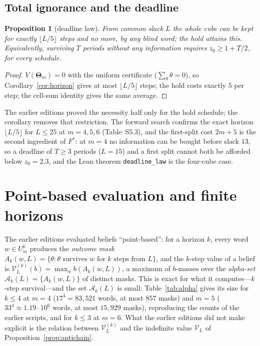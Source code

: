 \documentclass[11pt,a4paper]{article}
\theoremstyle{plain}
\newtheorem{proposition}[theorem]{Proposition}
\theoremstyle{definition}
\theoremstyle{remark}
\newcommand{\calA}{\mathcal{A}}
\let\GreekTheta\Theta
\renewcommand{\Theta}{\boldsymbol{\GreekTheta}}
\newcommand{\Fstar}{F^{\ast}}
\begin{document}
\subsection{Total ignorance and the deadline}
\begin{proposition}[deadline law]\label{prop:deadline}
From common slack $L$ the whole cube can be kept for exactly $\lfloor L/5\rfloor$ steps and no more, by any blind word; the hold attains this. Equivalently, surviving $T$ periods without any information requires $z_0\ge1+T/2$, for every schedule.
\end{proposition}
\begin{proof}
$V(\Theta_m)=0$ with the uniform certificate ($\sum_\theta\theta=0$), so Corollary~\ref{cor:horizon} gives at most $\lfloor L/5\rfloor$ steps; the hold costs exactly $5$ per step; the cell-sum identity gives the same average.
\end{proof}
The earlier editions proved the necessity half only for the hold schedule; the corollary removes that restriction. The forward search confirms the exact horizon $\lfloor L/5\rfloor$ for $L\le25$ at $m=4,5,6$ (Table~S5.3), and the first-split cost $2m+5$ is the second ingredient of $\Fstar$: at $m=4$ no information can be bought before slack $13$, so a deadline of $T\ge3$ periods ($L=15$) and a first split cannot both be afforded below $z_0=2.3$, and the Lean theorem \texttt{deadline\_law} is the four-cube case.
\section{Point-based evaluation and finite horizons}\label{sec:pbvi}

The earlier editions evaluated beliefs ``point-based'': for a horizon $k$, every word $w\in U_m^k$ produces the \emph{outcome mask} $A_k(w,L)=\{\theta:\theta\text{ survives }w\text{ for }k\text{ steps from }L\}$, and the $k$-step value of a belief is $\mathcal V^{(k)}_L(b)=\max_w b(A_k(w,L))$, a maximum of $b$-masses over the \emph{alpha-set} $\calA_k(L)=\{A_k(w,L)\}$ of distinct masks. This is exact for what it computes---$k$-step survival---and the set $\calA_k(L)$ is small: Table~\ref{tab:alpha} gives its size for $k\le4$ at $m=4$ ($17^4=83{,}521$ words, at most $857$ masks) and $m=5$ ($33^4\approx1.19\cdot10^6$ words, at most $15{,}929$ masks), reproducing the counts of the earlier scripts, and for $k\le3$ at $m=6$. What the earlier editions did not make explicit is the relation between $\mathcal V^{(k)}_L$ and the indefinite value $\mathcal V_L$ of Proposition~\ref{prop:antichain}.
\end{document}
